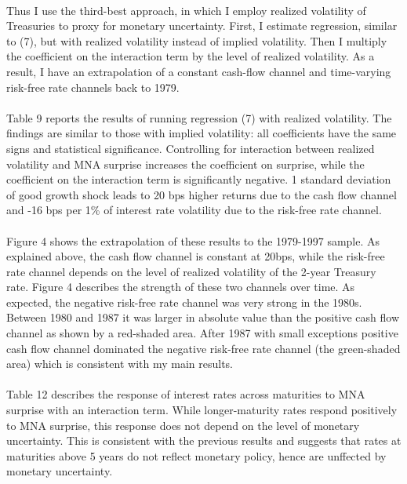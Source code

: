 \documentclass[12pt]{article}
\begin{document}
\paragraph{}
Thus I use the third-best approach, in which I employ realized volatility of Treasuries to proxy for monetary uncertainty. First, I estimate regression, similar to (7), but with realized volatility instead of implied volatility. Then I multiply the coefficient on the interaction term by the level of realized volatility. As a result, I have an extrapolation of a constant cash-flow channel and time-varying risk-free rate channels back to 1979.
\paragraph{}
Table 9 reports the results of running regression (7) with realized volatility. The findings are similar to those with implied volatility: all coefficients have the same signs and statistical significance. Controlling for interaction between realized volatility and MNA surprise increases the coefficient on surprise, while the coefficient on the interaction term is significantly negative. 1 standard deviation of good growth shock leads to 20 bps higher returns due to the cash flow channel and -16 bps per 1\% of interest rate volatility due to the risk-free rate channel. 
\paragraph{}
Figure 4 shows the extrapolation of these results to the 1979-1997 sample. As explained above, the cash flow channel is constant at 20bps, while the risk-free rate channel depends on the level of realized volatility of the 2-year Treasury rate. Figure 4 describes the strength of these two channels over time. As expected, the negative risk-free rate channel was very strong in the 1980s. Between 1980 and 1987 it was larger in absolute value than the positive cash flow channel as shown by a red-shaded area. After 1987 with small exceptions positive cash flow channel dominated the negative risk-free rate channel (the green-shaded area) which is consistent with my main results.
\paragraph{}
Table 12 describes the response of interest rates across maturities to MNA surprise with an interaction term. While longer-maturity rates respond positively to MNA surprise, this response does not depend on the level of monetary uncertainty. This is consistent with the previous results and suggests that rates at maturities above 5 years do not reflect monetary policy, hence are unffected by monetary uncertainty.
\end{document}
